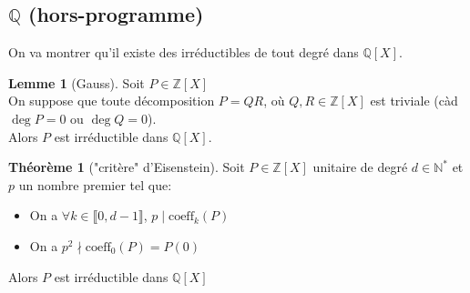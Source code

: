\documentclass[10pt,a4paper]{article}
\theoremstyle{definition}
\newtheorem{theorem}[proposition]{Théorème}
\newtheorem{lemme}[proposition]{Lemme}
\begin{document}
\subsection{$\mathbb{Q}$ (hors-programme)}
On va montrer qu'il existe des irréductibles de tout degré dans $\mathbb{Q}[X]$.
\begin{lemme}[Gauss]
Soit $P \in \mathbb{Z}[X]$ \\
On suppose que toute décomposition $P = QR$, où $Q, R \in \mathbb{Z}[X]$ est triviale (càd $\deg{P} = 0$ ou $\deg{Q} = 0$). \\
Alors $P$ est irréductible dans $\mathbb{Q}[X]$.
\end{lemme}
\begin{theorem}["critère" d'Eisenstein]
Soit $P \in \mathbb{Z}[X]$ unitaire de degré $d \in \mathbb{N}^*$ et $p$ un nombre premier tel que:
\begin{itemize}
\item On a $\forall k \in \llbracket 0, d - 1 \rrbracket$, $p \mid \text{coeff}_k(P)$
\item On a $p^2 \nmid \text{coeff}_0(P) = P(0)$
\end{itemize}
Alors $P$ est irréductible dans $\mathbb{Q}[X]$
\end{theorem}
\end{document}
